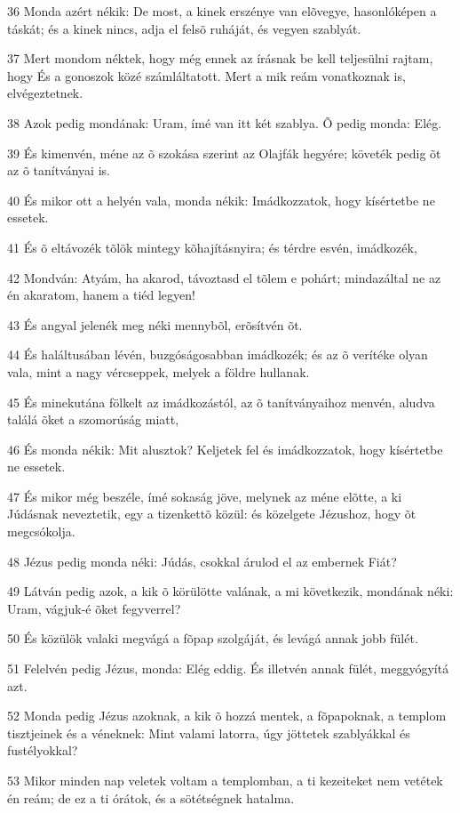 \par 36 Monda azért nékik: De most, a kinek erszénye van elõvegye, hasonlóképen a táskát; és a kinek nincs, adja el felsõ ruháját, és vegyen szablyát.
\par 37 Mert mondom néktek, hogy még ennek az írásnak be kell teljesülni rajtam, hogy És a gonoszok közé számláltatott. Mert a mik reám vonatkoznak is, elvégeztetnek.
\par 38 Azok pedig mondának: Uram, ímé van itt két szablya. Õ pedig monda: Elég.
\par 39 És kimenvén, méne az õ szokása szerint az Olajfák hegyére; követék pedig õt az õ tanítványai is.
\par 40 És mikor ott a helyén vala, monda nékik: Imádkozzatok, hogy kísértetbe ne essetek.
\par 41 És õ eltávozék tõlök mintegy kõhajításnyira; és térdre esvén, imádkozék,
\par 42 Mondván: Atyám, ha akarod, távoztasd el tõlem e pohárt; mindazáltal ne az én akaratom, hanem a tiéd legyen!
\par 43 És angyal jelenék meg néki mennybõl, erõsítvén õt.
\par 44 És haláltusában lévén, buzgóságosabban imádkozék; és az õ verítéke olyan vala, mint a nagy vércseppek, melyek a földre hullanak.
\par 45 És minekutána fölkelt az imádkozástól, az õ tanítványaihoz menvén, aludva találá õket a szomorúság miatt,
\par 46 És monda nékik: Mit alusztok? Keljetek fel és imádkozzatok, hogy kísértetbe ne essetek.
\par 47 És mikor még beszéle, ímé sokaság jöve, melynek az méne elõtte, a ki Júdásnak neveztetik, egy a tizenkettõ közül: és közelgete Jézushoz, hogy õt megcsókolja.
\par 48 Jézus pedig monda néki: Júdás, csokkal árulod el az embernek Fiát?
\par 49 Látván pedig azok, a kik õ körülötte valának, a mi következik, mondának néki: Uram, vágjuk-é õket fegyverrel?
\par 50 És közülök valaki megvágá a fõpap szolgáját, és levágá annak jobb fülét.
\par 51 Felelvén pedig Jézus, monda: Elég eddig. És illetvén annak fülét, meggyógyítá azt.
\par 52 Monda pedig Jézus azoknak, a kik õ hozzá mentek, a fõpapoknak, a templom tisztjeinek és a véneknek: Mint valami latorra, úgy jöttetek szablyákkal és fustélyokkal?
\par 53 Mikor minden nap veletek voltam a templomban, a ti kezeiteket nem vetétek én reám; de ez  a ti órátok, és a sötétségnek hatalma.
